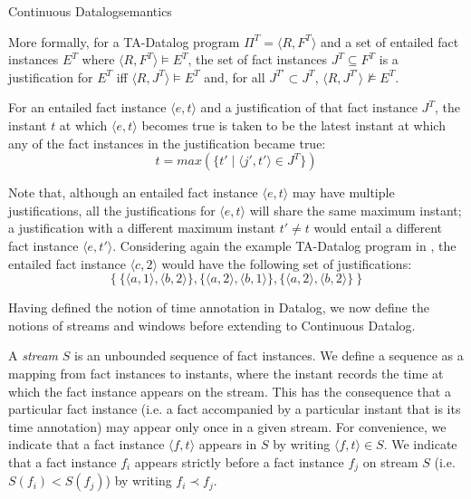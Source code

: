 \begin{nestedsection}{Continuous Datalog}{semantics}
\begin{definition}
More formally, for a TA-Datalog program $\Pi^T = \langle R, F^T \rangle$
and a set of entailed fact instances $E^T$ where $\langle R, F^T \rangle \models E^T$, the set of fact instances $J^T \subseteq F^T$ is a justification for
$E^T$ iff $\langle R, J^T \rangle \models E^T$ and, for all $J^{T\prime} \subset J^T$, $\langle R, J^{T\prime}\rangle \not\models E^T$.

For an entailed fact instance $\langle e, t\rangle$ and a
justification of that fact instance $J^T$, the instant $t$ at which
$\langle e, t \rangle$ becomes true is taken to be the latest instant
at which any of the fact instances in the justification became true:
\[ t = max(\{ t' \mid \langle j', t' \rangle \in J^T \}) \]

Note that, although an entailed fact instance $\langle e, t\rangle$
may have multiple justifications, all the justifications for $\langle
e, t \rangle$ will share the same maximum instant; a justification
with a different maximum instant $t' \neq t$ would entail a different
fact instance $\langle e, t' \rangle$. Considering again the example
TA-Datalog program in ,
the entailed fact instance $\langle c, 2 \rangle$ would have the
following set of justifications:
\[
  \{ \ \{ \langle a, 1 \rangle, \langle b, 2 \rangle \},  \{ \langle a, 2 \rangle, \langle b, 1 \rangle \},  \{ \langle a, 2 \rangle, \langle b, 2 \rangle \} \  \}
\]

\end{definition}

Having defined the notion of time annotation in Datalog, we now define
the notions of streams and windows before extending to Continuous Datalog.

\begin{definition}[Streams]

A {\em stream} $S$ is an unbounded sequence of fact instances. We
define a sequence as a mapping from fact instances to instants, where
the instant records the time at which the fact instance appears on the
stream. This has the consequence that a particular fact instance
(i.e. a fact accompanied by a particular instant that is its time
annotation) may appear only once in a given stream. For convenience,
we indicate that a fact instance $\langle f, t\rangle$ appears in $S$
by writing $\langle f, t \rangle \in S$. We indicate that a fact
instance $f_i$ appears strictly before a fact instance $f_j$ on stream
$S$ (i.e. $S(f_i) < S(f_j)$) by writing $f_i \prec f_j$.


\end{definition}
\end{nestedsection}
